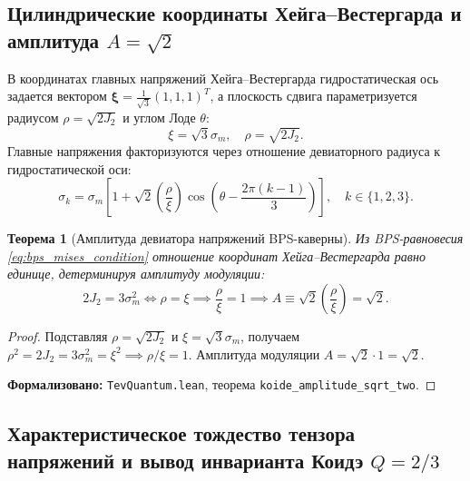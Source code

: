 \documentclass[11pt,a4paper]{article}
\newtheorem{theorem}{Теорема}
\theoremstyle{definition}
\theoremstyle{remark}
\begin{document}
\subsection{Цилиндрические координаты Хейга--Вестергарда и амплитуда $A = \sqrt{2}$}

В координатах главных напряжений Хейга--Вестергарда гидростатическая ось задается вектором $\boldsymbol{\xi} = \frac{1}{\sqrt{3}}(1, 1, 1)^T$, а плоскость сдвига параметризуется радиусом $\rho = \sqrt{2J_2}$ и углом Лоде $\theta$:
\begin{equation}
    \xi = \sqrt{3}\sigma_m, \quad \rho = \sqrt{2J_2}.
    \label{eq:haigh_westergaard_coords}
\end{equation}
Главные напряжения факторизуются через отношение девиаторного радиуса к гидростатической оси:
\begin{equation}
    \sigma_k = \sigma_m \left[ 1 + \sqrt{2} \left(\frac{\rho}{\xi}\right) \cos\left(\theta - \frac{2\pi(k-1)}{3}\right) \right], \quad k \in \{1, 2, 3\}.
    \label{eq:principal_stresses_factored}
\end{equation}

\begin{theorem}[Амплитуда девиатора напряжений BPS-каверны]
\label{thm:deviator_amplitude_sqrt2}
Из BPS-равновесия \eqref{eq:bps_mises_condition} отношение координат Хейга--Вестергарда равно единице, детерминируя амплитуду модуляции:
\begin{equation}
    2J_2 = 3\sigma_m^2 \iff \rho = \xi \implies \frac{\rho}{\xi} = 1 \implies A \equiv \sqrt{2}\left(\frac{\rho}{\xi}\right) = \sqrt{2}.
    \label{eq:deviator_amplitude_exact}
\end{equation}
\end{theorem}
\begin{proof}
Подставляя $\rho = \sqrt{2J_2}$ и $\xi = \sqrt{3}\sigma_m$, получаем $\rho^2 = 2J_2 = 3\sigma_m^2 = \xi^2 \implies \rho/\xi = 1$. Амплитуда модуляции $A = \sqrt{2} \cdot 1 = \sqrt{2}$.

\noindent\small\textbf{Формализовано:} \texttt{TevQuantum.lean}, теорема \texttt{koide_amplitude_sqrt_two}.
\end{proof}

\subsection{Характеристическое тождество тензора напряжений и вывод инварианта Коидэ $Q = 2/3$}
\end{document}
